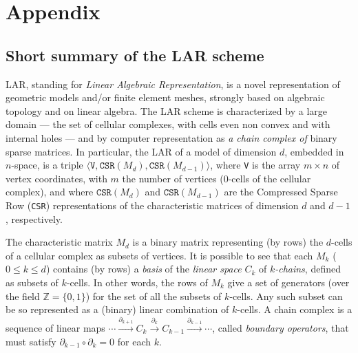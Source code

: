 \appendix
\section{Appendix}
\subsection{Short summary of the LAR scheme}

LAR, standing for \emph{Linear Algebraic Representation}, is a novel representation of geometric models and/or finite element meshes, strongly based on algebraic topology and on linear algebra. The LAR scheme is characterized by a large domain --- the set of cellular complexes, with cells even non convex and with internal holes --- and by computer representation as \emph{a chain complex of} binary sparse matrices. In particular, the LAR of a model of dimension $d$, embedded in $n$-space, is a triple $\langle \texttt{V}, \texttt{CSR}(M_d), \texttt{CSR}(M_{d-1}) \rangle$, where 
\texttt{V} is the array $m\times n$ of vertex coordinates, with $m$ the number of vertices (0-cells of the cellular complex), and where 
$\texttt{CSR}(M_d)$ and $\texttt{CSR}(M_{d-1})$ are the Compressed Sparse Row (\texttt{CSR}) representations of the characteristic matrices of dimension $d$ and $d-1$, respectively.  

The characteristic matrix $M_d$ is a binary matrix representing (by rows) the $d$-cells of a cellular complex as subsets of vertices. It is possible to see that each $M_k$ ($0\leq k\leq d$) contains (by rows) a \emph{basis} of the \emph{linear space} $C_k$ of \emph{$k$-chains}, defined as subsets of $k$-cells. In other words, the rows of $M_k$ give a set of generators (over the field $\mathbb{Z} = \{0,1\}$) for the set of all the subsets of $k$-cells. Any such subset can be so represented as a (binary) linear combination of $k$-cells.
A chain complex is a sequence of linear maps $ \cdots \xrightarrow{\partial_{k+1}} C_k \xrightarrow{\partial_k} C_{k-1} \xrightarrow{\partial_{k-1}} \cdots $, called \emph{boundary operators}, that must satisfy $\partial_{k-1} \circ \partial_k=0$ for each $k$.


